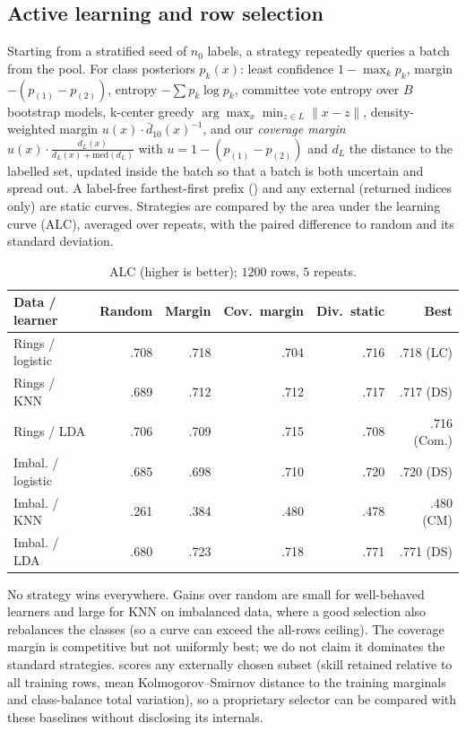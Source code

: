 \documentclass[conference]{IEEEtran}
\begin{document}
\subsection{Active learning and row selection}
Starting from a stratified seed of $n_0$ labels, a strategy repeatedly queries a batch from the pool. For class posteriors $p_k(x)$: least confidence $1-\max_k p_k$, margin $-(p_{(1)}-p_{(2)})$, entropy $-\sum p_k\log p_k$, committee vote entropy over $B$ bootstrap models, k-center greedy $\arg\max_x\min_{z\in L}\|x-z\|$, density-weighted margin $u(x)\cdot\bar d_{10}(x)^{-1}$, and our \emph{coverage margin} $u(x)\cdot\frac{d_L(x)}{d_L(x)+\mathrm{med}(d_L)}$ with $u=1-(p_{(1)}-p_{(2)})$ and $d_L$ the distance to the labelled set, updated inside the batch so that a batch is both uncertain and spread out. A label-free farthest-first prefix () and any external  (returned indices only) are static curves. Strategies are compared by the area under the learning curve (ALC), averaged over repeats, with the paired difference to random and its standard deviation.
\begin{table}[t]\caption{ALC (higher is better); $1200$ rows, $5$ repeats.}\label{tab:al}\centering\scriptsize
\begin{tabular}{@{}lrrrrr@{}}\toprule
Data / learner & Random & Margin & Cov.\ margin & Div.\ static & Best \\\midrule
Rings / logistic & .708 & .718 & .704 & .716 & .718 (LC) \\
Rings / KNN & .689 & .712 & .712 & .717 & .717 (DS) \\
Rings / LDA & .706 & .709 & .715 & .708 & .716 (Com.) \\
Imbal. / logistic & .685 & .698 & .710 & .720 & .720 (DS) \\
Imbal. / KNN & .261 & .384 & .480 & .478 & .480 (CM) \\
Imbal. / LDA & .680 & .723 & .718 & .771 & .771 (DS) \\\bottomrule
\end{tabular}\end{table}
No strategy wins everywhere. Gains over random are small for well-behaved learners and large for KNN on imbalanced data, where a good selection also rebalances the classes (so a curve can exceed the all-rows ceiling). The coverage margin is competitive but not uniformly best; we do not claim it dominates the standard strategies.  scores any externally chosen subset (skill retained relative to all training rows, mean Kolmogorov--Smirnov distance to the training marginals and class-balance total variation), so a proprietary selector can be compared with these baselines without disclosing its internals.
\end{document}
